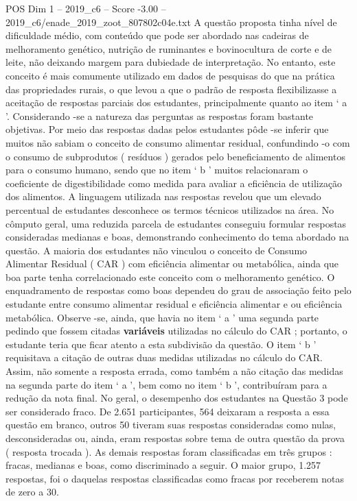 \begin{textsample}{POS Dim 1 – 2019\_c6 – Score -3.00 – 2019\_c6/enade\_2019\_zoot\_807802c04e.txt}
A questão proposta tinha nível de dificuldade médio, com conteúdo que pode ser abordado nas cadeiras de melhoramento genético, nutrição de ruminantes e bovinocultura de corte e de leite, não deixando margem para dubiedade de interpretação.
No entanto, este conceito é mais comumente utilizado em dados de pesquisas do que na prática das propriedades rurais, o que levou a que o padrão de resposta flexibilizasse a aceitação de respostas parciais dos estudantes, principalmente quanto ao item ‘ a ’.
Considerando -se a natureza das perguntas as respostas foram bastante objetivas.
Por meio das respostas dadas pelos estudantes pôde -se inferir que muitos não sabiam o conceito de consumo alimentar residual, confundindo -o com o consumo de subprodutos ( resíduos ) gerados pelo beneficiamento de alimentos para o consumo humano, sendo que no item ‘ b ’ muitos relacionaram o coeficiente de digestibilidade como medida para avaliar a eficiência de utilização dos alimentos.
A linguagem utilizada nas respostas revelou que um elevado percentual de estudantes desconhece os termos técnicos utilizados na área.
No cômputo geral, uma reduzida parcela de estudantes conseguiu formular respostas consideradas medianas e boas, demonstrando conhecimento do tema abordado na questão.
A maioria dos estudantes não vinculou o conceito de Consumo Alimentar Residual ( CAR ) com eficiência alimentar ou metabólica, ainda que boa parte tenha correlacionado este conceito com o melhoramento genético.
O enquadramento de respostas como boas dependeu do grau de associação feito pelo estudante entre consumo alimentar residual e eficiência alimentar e ou eficiência metabólica.
Observe -se, ainda, que havia no item ‘ a ’ uma segunda parte pedindo que fossem citadas \textbf{variáveis} utilizadas no cálculo do CAR ; portanto, o estudante teria que ficar atento a esta subdivisão da questão.
O item ‘ b ’ requisitava a citação de outras duas medidas utilizadas no cálculo do CAR.
Assim, não somente a resposta errada, como também a não citação das medidas na segunda parte do item ‘ a ’, bem como no item ‘ b ’, contribuíram para a redução da nota final.
No geral, o desempenho dos estudantes na Questão 3 pode ser considerado fraco.
De 2.651 participantes, 564 deixaram a resposta a essa questão em branco, outros 50 tiveram suas respostas consideradas como nulas, desconsideradas ou, ainda, eram respostas sobre tema de outra questão da prova ( resposta trocada ).
As demais respostas foram classificadas em três grupos : fracas, medianas e boas, como discriminado a seguir.
O maior grupo, 1.257 respostas, foi o daquelas respostas classificadas como fracas por receberem notas de zero a 30.

\end{textsample}

